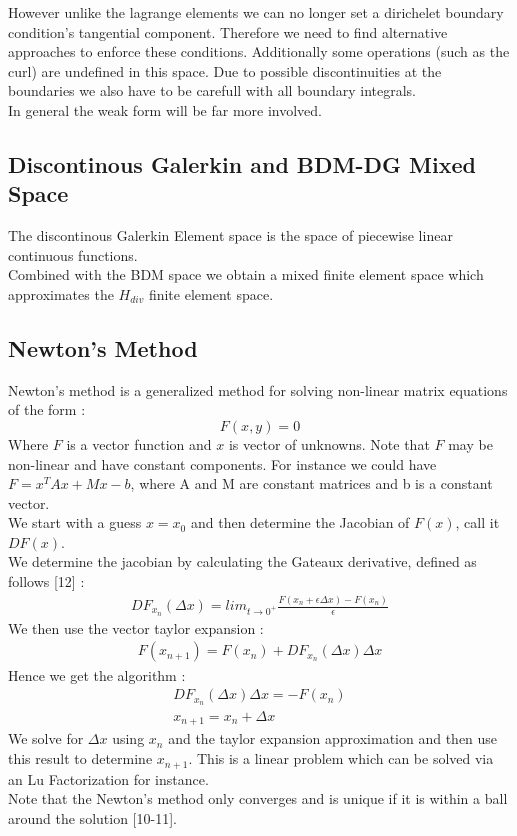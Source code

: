 \documentclass[11pt,twoside,a4paper]{article}
\begin{document}
However unlike the lagrange elements we can no longer set a dirichelet boundary condition's tangential component. Therefore we need to find alternative approaches to enforce these conditions.
Additionally some operations (such as the curl) are undefined in this space. Due to possible discontinuities at the boundaries we also have to be carefull with all boundary integrals.\\

In general the weak form will be far more involved.


\subsection{Discontinous Galerkin and BDM-DG Mixed Space}
The discontinous Galerkin Element space is the space of piecewise linear continuous functions.\\
Combined with the BDM space we obtain a mixed finite element space which approximates the $H_{div}$ finite element space.\\

\subsection{Newton's Method}

Newton's method is a generalized method for solving non-linear matrix equations of the form :
$$
F(x,y) = 0
$$
Where $F$ is a vector function and $x$ is vector of unknowns. Note that $F$ may be non-linear and have constant components.
For instance we could have $ F = x^T A x + M x - b$, where A and M are constant matrices and b is a constant vector.\\ 
We start with a guess $x = x_0$ and then determine the Jacobian of $F(x)$, call it $DF(x)$.\\
We determine the jacobian by calculating the Gateaux derivative, defined as follows [12] :
\begin{align}
DF_{x_n}(\Delta x) = lim_{t \rightarrow 0^+} \frac{F(x_n+ \epsilon \Delta x) - F(x_n)}{\epsilon}
\end{align}
We then use the vector taylor expansion :
\begin{align*}
F(x_{n+1}) = F(x_n) + DF_{x_n}(\Delta x) \Delta x 
\end{align*}
Hence we get the algorithm :
\begin{align}
DF_{x_n}(\Delta x) \Delta x = - F(x_n)\\
x_{n+1} = x_n + \Delta x 
\end{align}
We solve for $\Delta x$ using $x_n$ and the taylor expansion approximation and then use this result to determine $x_{n+1}$.
This is a linear problem which can be solved via an Lu Factorization for instance.\\
Note that the Newton's method only converges and is unique if it is within a ball around the solution [10-11].
\end{document}
